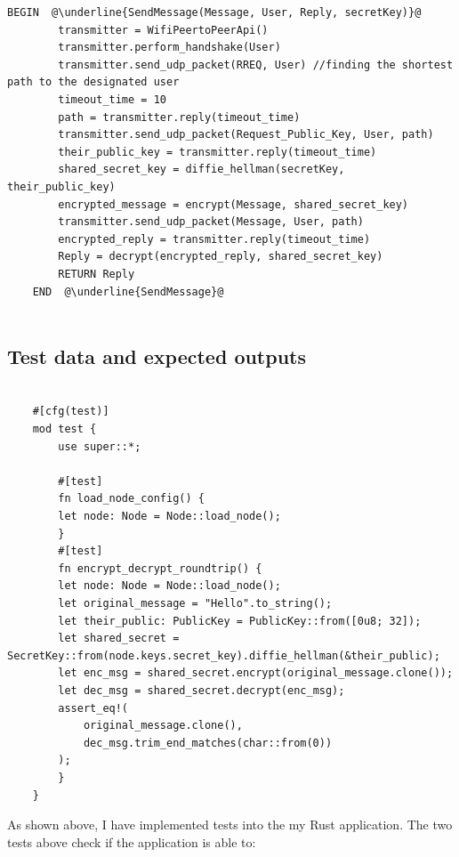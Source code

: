 \documentclass[a4paper, titlepage]{article}
\begin{document}
\begin{lstlisting}[caption=Send Data Packets over Network, escapechar=\@]
	BEGIN  @\underline{SendMessage(Message, User, Reply, secretKey)}@
		transmitter = WifiPeertoPeerApi()
		transmitter.perform_handshake(User)
		transmitter.send_udp_packet(RREQ, User) //finding the shortest path to the designated user
		timeout_time = 10
		path = transmitter.reply(timeout_time)
		transmitter.send_udp_packet(Request_Public_Key, User, path)
		their_public_key = transmitter.reply(timeout_time)
		shared_secret_key = diffie_hellman(secretKey, their_public_key)
		encrypted_message = encrypt(Message, shared_secret_key)
		transmitter.send_udp_packet(Message, User, path)
		encrypted_reply = transmitter.reply(timeout_time)
		Reply = decrypt(encrypted_reply, shared_secret_key)
		RETURN Reply
	END  @\underline{SendMessage}@
			
\end{lstlisting}

\vfill{}

\subsection{Test data and expected outputs}
\begin{lstlisting}[caption=Rust Tests, escapechar=\@]

	#[cfg(test)]
	mod test {
	    use super::*;

	    #[test]
	    fn load_node_config() {
		let node: Node = Node::load_node();
	    }
	    #[test]
	    fn encrypt_decrypt_roundtrip() {
		let node: Node = Node::load_node();
		let original_message = "Hello".to_string();
		let their_public: PublicKey = PublicKey::from([0u8; 32]);
		let shared_secret = SecretKey::from(node.keys.secret_key).diffie_hellman(&their_public);
		let enc_msg = shared_secret.encrypt(original_message.clone());
		let dec_msg = shared_secret.decrypt(enc_msg);
		assert_eq!(
		    original_message.clone(),
		    dec_msg.trim_end_matches(char::from(0))
		);
	    }
	}
\end{lstlisting}
\renewcommand{\rmdefault}{cmr}
As shown above, I have implemented tests into the my Rust application. The two tests above check if the application is able to: \\
\end{document}
